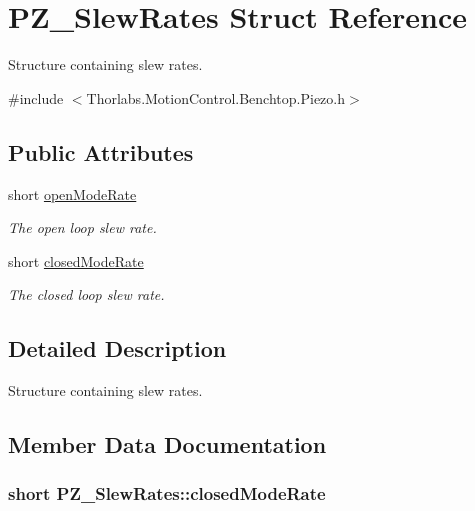 \hypertarget{struct_p_z___slew_rates}{}\section{P\+Z\+\_\+\+Slew\+Rates Struct Reference}
\label{struct_p_z___slew_rates}


Structure containing slew rates.  




{\ttfamily \#include $<$Thorlabs.\+Motion\+Control.\+Benchtop.\+Piezo.\+h$>$}

\subsection*{Public Attributes}
\begin{DoxyCompactItemize}
\item 
short \hyperlink{struct_p_z___slew_rates_a1fc3ac86dba74540fc1ba16ae0b3daba}{open\+Mode\+Rate}
\begin{DoxyCompactList}\small\item\em The open loop slew rate. \end{DoxyCompactList}\item 
short \hyperlink{struct_p_z___slew_rates_a82ea1a4412126e4d69f13e600aa48e68}{closed\+Mode\+Rate}
\begin{DoxyCompactList}\small\item\em The closed loop slew rate. \end{DoxyCompactList}\end{DoxyCompactItemize}


\subsection{Detailed Description}
Structure containing slew rates. 



\subsection{Member Data Documentation}
\subsubsection[{\texorpdfstring{closed\+Mode\+Rate}{closedModeRate}}]{\setlength{\rightskip}{0pt plus 5cm}short P\+Z\+\_\+\+Slew\+Rates\+::closed\+Mode\+Rate}\hypertarget{struct_p_z___slew_rates_a82ea1a4412126e4d69f13e600aa48e68}{}\label{struct_p_z___slew_rates_a82ea1a4412126e4d69f13e600aa48e68}


